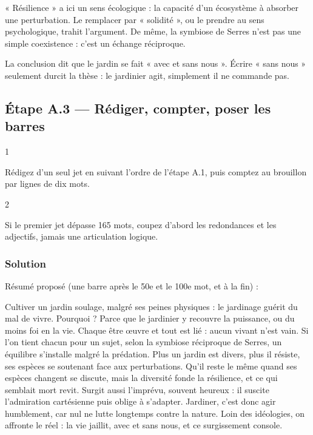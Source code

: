 \documentclass[11pt,a4paper]{article}
\begin{document}
\begin{piege}

« Résilience » a ici un sens écologique : la capacité d'un écosystème à absorber une perturbation. Le remplacer par « solidité », ou le prendre au sens psychologique, trahit l'argument. De même, la symbiose de Serres n'est pas une simple coexistence : c'est un échange réciproque.

\end{piege}

\begin{piege}

La conclusion dit que le jardin se fait « avec et sans nous ». Écrire « sans nous » seulement durcit la thèse : le jardinier agit, simplement il ne commande pas.

\end{piege}

\hypertarget{uxe9tape-a.3-ruxe9diger-compter-poser-les-barres}{%
\subsection{Étape A.3 --- Rédiger, compter, poser les barres}\label{uxe9tape-a.3-ruxe9diger-compter-poser-les-barres}}

\begin{indication}{1}

Rédigez d'un seul jet en suivant l'ordre de l'étape A.1, puis comptez au brouillon par lignes de dix mots.

\end{indication}

\begin{indication}{2}

Si le premier jet dépasse 165 mots, coupez d'abord les redondances et les adjectifs, jamais une articulation logique.

\end{indication}

\hypertarget{solution-2}{%
\subsubsection{Solution}\label{solution-2}}

Résumé proposé (une barre après le 50e et le 100e mot, et à la fin) :

Cultiver un jardin soulage, malgré ses peines physiques : le jardinage guérit du mal de vivre. Pourquoi ? Parce que le jardinier y recouvre la puissance, ou du moins foi en la vie. Chaque être œuvre et tout est lié : aucun vivant n'est vain. Si l'on tient chacun pour un \textbf{\textbar{}} sujet, selon la symbiose réciproque de Serres, un équilibre s'installe malgré la prédation. Plus un jardin est divers, plus il résiste, ses espèces se soutenant face aux perturbations. Qu'il reste le même quand ses espèces changent se discute, mais la diversité fonde la résilience, et ce qui semblait \textbf{\textbar{}} mort revit. Surgit aussi l'imprévu, souvent heureux : il suscite l'admiration cartésienne puis oblige à s'adapter. Jardiner, c'est donc agir humblement, car nul ne lutte longtemps contre la nature. Loin des idéologies, on affronte le réel : la vie jaillit, avec et sans nous, et ce surgissement console. \textbf{\textbar{}}
\end{document}
